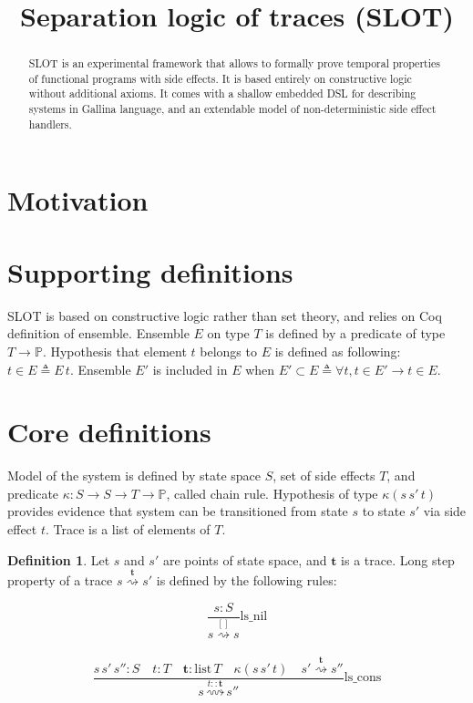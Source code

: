 \documentclass[10pt,letterpaper]{article}
\title{
		\huge Separation logic of traces (SLOT)
}
\newcommand \prop{\mathds{P}}
\newcommand \crpred[3]{\mathrel{\kappa\left(#1\,#2\,#3\right)}}
\newcommand \chain[3]{\mathrel{#1\stackrel{#3}{\rightsquigarrow}#2}}
\newcommand \bm[1]{\boldsymbol{#1}}
\theoremstyle{definition}
\newtheorem{definition}{Definition}
\begin{document}
\maketitle

\begin{abstract}
  SLOT is an experimental framework that allows to formally prove
  temporal properties of functional programs with side effects. It is
  based entirely on constructive logic without additional axioms. It
  comes with a shallow embedded DSL for describing systems in Gallina
  language, and an extendable model of non-deterministic side effect
  handlers.
\end{abstract}

\section{Motivation}

\section{Supporting definitions}

SLOT is based on constructive logic rather than set theory, and relies
on Coq definition of ensemble. Ensemble $E$ on type $T$ is defined by
a predicate of type $T \to \prop$. Hypothesis that element $t$ belongs
to $E$ is defined as following: $t \in E \triangleq E\, t$. Ensemble
$E'$ is included in $E$ when
$E' \subset E \triangleq \forall t, t \in E' \to t \in E$.

\section{Core definitions}

Model of the system is defined by state space $S$, set of side effects
$T$, and predicate $\mathrel{\kappa:S\to S\to T\to \prop}$, called
chain rule. Hypothesis of type $\crpred{s}{s'}{t}$ provides evidence that
system can be transitioned from state $s$ to state $s'$ via side
effect $t$. Trace is a list of elements of $T$.

\begin{definition}
  Let $s$ and $s'$ are points of state space, and $\bm{t}$ is a trace.
  Long step property of a trace $\chain{s}{s'}{\bm{t}}$ is defined by
  the following rules:

  \begin{equation}
    \frac{s : S}{\chain{s}{s}{[]}} \text{ls\_nil}
  \end{equation}
  \\
  \begin{equation}
    \frac{s\, s' \, s'' : S \quad  t : T \quad \bm{t} : \text{list}\,T \quad \crpred{s}{s'}{t} \quad \chain{s'}{s''}{\bm{t}}}
         {\chain{s}{s''}{t::\bm{t}}}
    \text{ls\_cons}
  \end{equation}
\end{definition}
\end{document}

